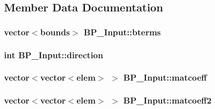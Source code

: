 \subsection{Member Data Documentation}
\hypertarget{class_b_p___input_a964eaa6ceec4d2edf5ab2e70338077a5}{
\subsubsection[{bterms}]{\setlength{\rightskip}{0pt plus 5cm}vector$<${\bf bounds}$>$ B\-P\-\_\-\-Input\-::bterms\hspace{0.3cm}{\ttfamily [protected]}}}\label{class_b_p___input_a964eaa6ceec4d2edf5ab2e70338077a5}
\hypertarget{class_b_p___input_a815e964e6687ba9572ff5eded8428ab7}{
\subsubsection[{direction}]{\setlength{\rightskip}{0pt plus 5cm}int B\-P\-\_\-\-Input\-::direction\hspace{0.3cm}{\ttfamily [protected]}}}\label{class_b_p___input_a815e964e6687ba9572ff5eded8428ab7}
\hypertarget{class_b_p___input_ab55ff15bb47a828b7a3c83c32e1c18c3}{
\subsubsection[{matcoeff}]{\setlength{\rightskip}{0pt plus 5cm}vector$<$vector$<${\bf elem}$>$ $>$ B\-P\-\_\-\-Input\-::matcoeff\hspace{0.3cm}{\ttfamily [protected]}}}\label{class_b_p___input_ab55ff15bb47a828b7a3c83c32e1c18c3}
\hypertarget{class_b_p___input_a213441fb4dcffbe23c104142b4169d42}{
\subsubsection[{matcoeff2}]{\setlength{\rightskip}{0pt plus 5cm}vector$<$vector$<${\bf elem}$>$ $>$ B\-P\-\_\-\-Input\-::matcoeff2\hspace{0.3cm}{\ttfamily [protected]}}}\label{class_b_p___input_a213441fb4dcffbe23c104142b4169d42}
